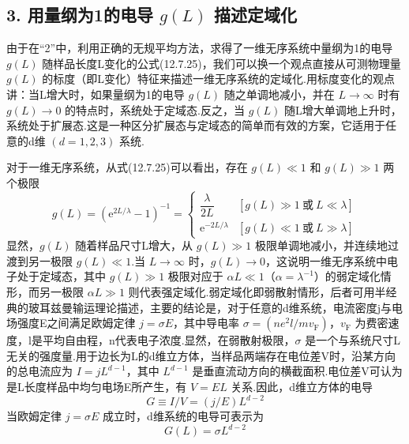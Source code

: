 \subsection*{3. 用量纲为1的电导 $g(L)$ 描述定域化}

由于在“2”中，利用正确的无规平均方法，求得了一维无序系统中量纲为1的电导 $g\left(L\right)$ 随样品长度L变化的公式(12.7.25)，我们可以换一个观点直接从可测物理量 $g\left(L\right)$ 的标度（即L变化）特征来描述一维无序系统的定域化.用标度变化的观点讲：当L增大时，如果量纲为1的电导 $g\left(L\right)$ 随之单调地减小，并在 $L\rightarrow\infty$ 时有 $g\left(L\right)\rightarrow0$ 的特点时，系统处于定域态.反之，当 $g\left(L\right)$ 随L增大单调地上升时，系统处于扩展态.这是一种区分扩展态与定域态的简单而有效的方案，它适用于任意的d维 $\left(d=1,2,3\right)$ 系统.

对于一维无序系统，从式(12.7.25)可以看出，存在 $g\left(L\right)\ll1$ 和 $g\left(L\right)\gg1$ 两个极限
\begin{equation}
  g\left(L\right)=\left(\mathrm{e}^{2L/\lambda}-1\right)^{-1}
  =\begin{cases}
    \dfrac{\lambda}{2L} & \left[g\left(L\right)\gg1\ \text{或}\ L\ll\lambda\right]\\[0.8em]
    \mathrm{e}^{-2L/\lambda} & \left[g\left(L\right)\ll1\ \text{或}\ L\gg\lambda\right]
  \end{cases}
\end{equation}
显然，$g\left(L\right)$ 随着样品尺寸L增大，从 $g\left(L\right)\gg1$ 极限单调地减小，并连续地过渡到另一极限 $g\left(L\right)\ll1$.当 $L\rightarrow\infty$ 时，$g\left(L\right)\rightarrow0$，这说明一维无序系统中电子处于定域态，其中 $g\left(L\right)\gg1$ 极限对应于 $\alpha L\ll1$（$\alpha=\lambda^{-1}$）的弱定域化情形，而另一极限 $\alpha L\gg1$ 则代表强定域化.弱定域化即弱散射情形，后者可用半经典的玻耳兹曼输运理论描述，主要的结论是，对于任意的d维系统，电流密度j与电场强度E之间满足欧姆定律 $j=\sigma E$，其中导电率 $\sigma=\left(ne^{2}l/mv_{\mathrm{F}}\right)$，$v_{\mathrm{F}}$ 为费密速度，l是平均自由程，n代表电子浓度.显然，在弱散射极限，$\sigma$ 是一个与系统尺寸L无关的强度量.用于边长为L的d维立方体，当样品两端存在电位差V时，沿某方向的总电流应为 $I=jL^{d-1}$，其中 $L^{d-1}$ 是垂直流动方向的横截面积.电位差V可认为是L长度样品中均匀电场E所产生，有 $V=EL$ 关系.因此，d维立方体的电导
\begin{equation}
  G\equiv I/V=\left(j/E\right)L^{d-2}
\end{equation}
当欧姆定律 $j=\sigma E$ 成立时，d维系统的电导可表示为
\begin{equation}
  G\left(L\right)=\sigma L^{d-2}
\end{equation}
